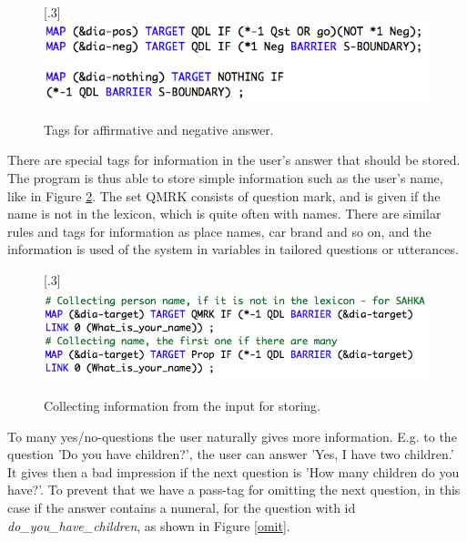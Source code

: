 \documentclass[11pt]{article}
\begin{document}
\begin{figure}[htbp]
\begin{center}
\scalebox{.3}[.3]{\includegraphics{presentation/img/aff_or_neg_colours.png}}\\
\caption{Tags for affirmative and negative answer. 
}
\label{afforneg}
\end{center}
\end{figure}


There are special tags for information in the user's answer that should be stored. The program is thus able to store simple information such as the user's name, like in Figure \ref{nametag}. The set QMRK consists of question mark, and is given if the name is not in the lexicon, which is quite often with names. There are similar rules and tags for information as place names, car brand and so on, and the information is used of the system in variables in tailored questions or utterances. \\

\begin{figure}[htbp]
\begin{center}
\scalebox{.3}[.3]{\includegraphics{presentation/img/picking_name_new.png}}\\
\caption{Collecting information from the input for storing.}
\label{nametag}
\end{center}
\end{figure}

To many yes/no-questions the user naturally gives more information. E.g. to the question 'Do you have children?', the user can answer 'Yes, I have two children.' It gives then a bad impression if the next question is 'How many children do you have?'. To prevent that we have a pass-tag for omitting the next question, in this case if the answer contains a numeral, for the question with id \textit{do\_you\_have\_children}, as shown in Figure \ref{omit}.   \\
\end{document}
